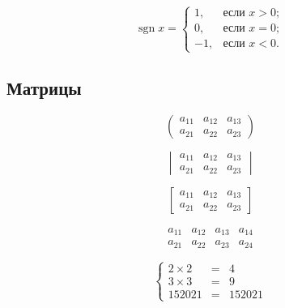 \documentclass[a4paper,12pt]{article} %
\DeclareMathOperator{\sgn}{\mathop{sgn}}
\begin{document}
$$
\sgn x= \begin{cases} %
	1, &\text{если } x>0;\\
	0, &\text{если } x=0;\\
	-1, &\text{если } x<0.
\end{cases}
$$

\subsection{Матрицы}

$$
\begin{pmatrix}
	a_{11} & a_{12} & a_{13}\\
	a_{21} & a_{22} & a_{23}
\end{pmatrix}
$$

$$
\begin{vmatrix}
	a_{11} & a_{12} & a_{13}\\
	a_{21} & a_{22} & a_{23}
\end{vmatrix}
$$

$$
\begin{bmatrix}
	a_{11} & a_{12} & a_{13}\\
	a_{21} & a_{22} & a_{23}
\end{bmatrix}
$$

$$
\begin{array}{lrcc}
	a_{11} & a_{12} & a_{13} & a_{14}\\
	a_{21} & a_{22} & a_{23} & a_{24}
\end{array}
$$

$$
\left\{
\begin{array}{rcl}
	2\times 2 & = & 4\\
	3\times 3 & = & 9\\
	152021 & = & 152021
\end{array}
\right.
$$
\end{document}
